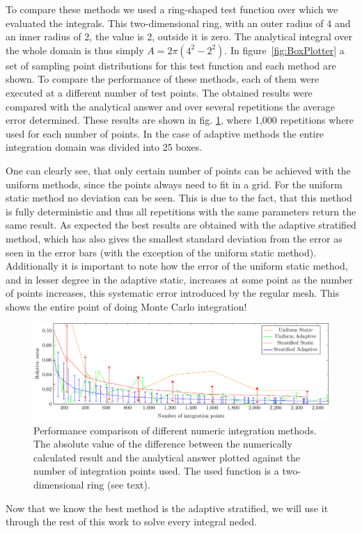 To compare these methods we used a ring-shaped test function over which we evaluated the integrals. This two-dimensional ring, with an outer radius of 4 and an inner radius of 2, the value is 2, outside it is zero. The analytical integral over the whole domain is thus simply $ A=2\pi (4^2-2^2)$.  In figure~\ref{fig:BoxPlotter} a set of sampling point distributions for this test function and each method are shown. To compare the performance of these methods, each of them were executed at a different number of test points. The obtained results were compared with the analytical answer and over several repetitions the average error determined. These results are shown in fig. \ref{fig:MCerrs}, where 1,000 repetitions where used for each number of points. In the case of adaptive methods the entire integration domain was divided into 25 boxes.

One can clearly see, that only certain number of points can be achieved with the uniform methods, since the points always need to fit in a grid. For the uniform static method no deviation can be seen. This is due to the fact, that this method is fully deterministic and thus all repetitions with the same parameters return the same result.
As expected the best results are obtained with the adaptive stratified method, which has also gives the smallest standard deviation from the error as seen in the error bars (with the exception of the uniform static method).
Additionally it is important to note how the error of the uniform static method, and in lesser degree in the adaptive static, increases at some point as the number of points increases, this systematic error introduced by the regular mesh. This shows the entire point of doing Monte Carlo integration!
\begin{figure}[th]
  \begin{center}
  \includegraphics[scale=0.9]{graphs/integration_test_ring.pdf}
  \caption{Performance comparison of different numeric integration methods. The absolute value of the difference between the numerically calculated result and the analytical answer plotted against the number of integration points used. The used function is a two-dimensional ring (see text).}
  \label{fig:MCerrs}
  \end{center}
\end{figure}

Now that we know the best method is the adaptive stratified, we will use it through the rest of this work to solve every integral neded.
